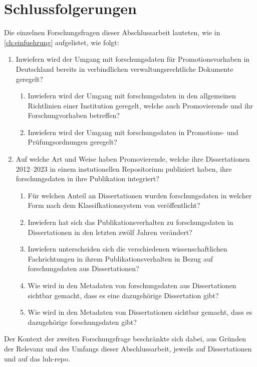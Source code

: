 \chapter{Schlussfolgerungen}\label{ch:schlussfolgerungen}
Die einzelnen Forschungsfragen dieser Abschlussarbeit lauteten, wie in \cref{ch:einfuehrung} aufgelistet, wie folgt:
\begin{enumerate}
    \item Inwiefern wird der Umgang mit \gls{forschungsdaten} für Promotionsvorhaben in Deutschland bereits in verbindlichen verwaltungsrechtliche Dokumente geregelt?
    \begin{enumerate}
        \item Inwiefern wird der Umgang mit \gls{forschungsdaten} in den allgemeinen Richtlinien einer Institution geregelt, welche auch Promovierende und ihr Forschungvorhaben betreffen?
        \item Inwiefern wird der Umgang mit \gls{forschungsdaten} in Promotions- und Prüfungsordnungen geregelt?
    \end{enumerate}
    \item Auf welche Art und Weise haben Promovierende, welche ihre Dissertationen 2012--2023 in einem instutionellen Repositorium publiziert haben, ihre \gls{forschungsdaten} in ihre Publikation integriert?
    \begin{enumerate}
        \item Für welchen Anteil an Dissertationen wurden \gls{forschungsdaten} in welcher Form nach dem Klassifkationssystem von \citeauthor{ReillyEtAl2011} \autocite{ReillyEtAl2011} veröffentlicht?
        \item Inwiefern hat sich das Publikationsverhalten zu \gls{forschungsdaten} in Dissertationen in den letzten zwölf Jahren verändert?
        \item Inwiefern unterscheiden sich die verschiedenen wissenschaftlichen Fachrichtungen in ihrem Publikationsverhalten in Bezug auf \gls{forschungsdaten} aus Dissertationen?
        \item Wie wird in den Metadaten von \gls{forschungsdaten} aus Dissertationen sichtbar gemacht, dass es eine dazugehörige Dissertation gibt?
        \item Wie wird in den Metadaten von Dissertationen sichtbar gemacht, dass es dazugehörige \gls{forschungsdaten} gibt?
    \end{enumerate}
\end{enumerate}
Der Kontext der zweiten Forschungsfrage beschränkte sich dabei, aus Gründen der Relevanz und des Umfangs dieser Abschlussarbeit, jeweils auf Dissertationen und auf das \gls{luh-repo}.

